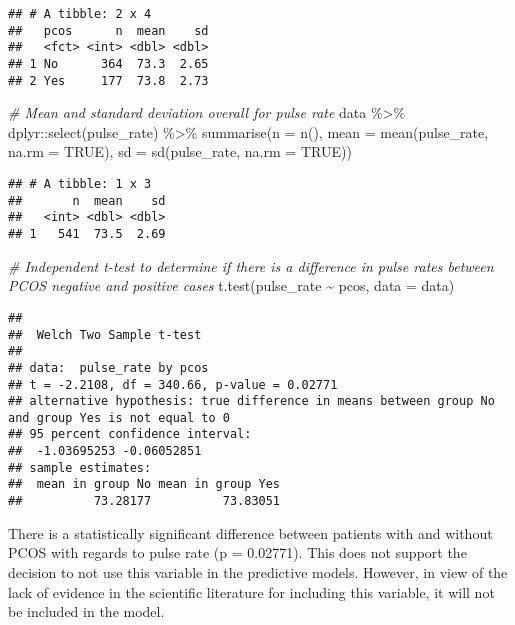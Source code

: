 \documentclass[
]{article}
\newenvironment{Shaded}{\begin{snugshade}}{\end{snugshade}}
\newcommand{\AttributeTok}[1]{\textcolor[rgb]{0.77,0.63,0.00}{#1}}
\newcommand{\CommentTok}[1]{\textcolor[rgb]{0.56,0.35,0.01}{\textit{#1}}}
\newcommand{\ConstantTok}[1]{\textcolor[rgb]{0.00,0.00,0.00}{#1}}
\newcommand{\FunctionTok}[1]{\textcolor[rgb]{0.00,0.00,0.00}{#1}}
\newcommand{\NormalTok}[1]{#1}
\newcommand{\SpecialCharTok}[1]{\textcolor[rgb]{0.00,0.00,0.00}{#1}}
\begin{document}
\begin{verbatim}
## # A tibble: 2 x 4
##   pcos      n  mean    sd
##   <fct> <int> <dbl> <dbl>
## 1 No      364  73.3  2.65
## 2 Yes     177  73.8  2.73
\end{verbatim}

\begin{Shaded}
\begin{Highlighting}[]
\CommentTok{\# Mean and standard deviation overall for pulse rate}
\NormalTok{data }\SpecialCharTok{\%\textgreater{}\%}\NormalTok{ dplyr}\SpecialCharTok{::}\FunctionTok{select}\NormalTok{(pulse\_rate) }\SpecialCharTok{\%\textgreater{}\%} 
  \FunctionTok{summarise}\NormalTok{(}\AttributeTok{n =} \FunctionTok{n}\NormalTok{(), }
            \AttributeTok{mean =} \FunctionTok{mean}\NormalTok{(pulse\_rate, }\AttributeTok{na.rm =} \ConstantTok{TRUE}\NormalTok{), }
            \AttributeTok{sd =} \FunctionTok{sd}\NormalTok{(pulse\_rate, }\AttributeTok{na.rm =} \ConstantTok{TRUE}\NormalTok{))}
\end{Highlighting}
\end{Shaded}

\begin{verbatim}
## # A tibble: 1 x 3
##       n  mean    sd
##   <int> <dbl> <dbl>
## 1   541  73.5  2.69
\end{verbatim}

\begin{Shaded}
\begin{Highlighting}[]
\CommentTok{\# Independent t{-}test to determine if there is a difference in pulse rates between PCOS negative and positive cases}
\FunctionTok{t.test}\NormalTok{(pulse\_rate }\SpecialCharTok{\textasciitilde{}}\NormalTok{ pcos, }\AttributeTok{data =}\NormalTok{ data)}
\end{Highlighting}
\end{Shaded}

\begin{verbatim}
## 
##  Welch Two Sample t-test
## 
## data:  pulse_rate by pcos
## t = -2.2108, df = 340.66, p-value = 0.02771
## alternative hypothesis: true difference in means between group No and group Yes is not equal to 0
## 95 percent confidence interval:
##  -1.03695253 -0.06052851
## sample estimates:
##  mean in group No mean in group Yes 
##          73.28177          73.83051
\end{verbatim}

There is a statistically significant difference between patients with
and without PCOS with regards to pulse rate (p = 0.02771). This does not
support the decision to not use this variable in the predictive models.
However, in view of the lack of evidence in the scientific literature
for including this variable, it will not be included in the model.
\end{document}
